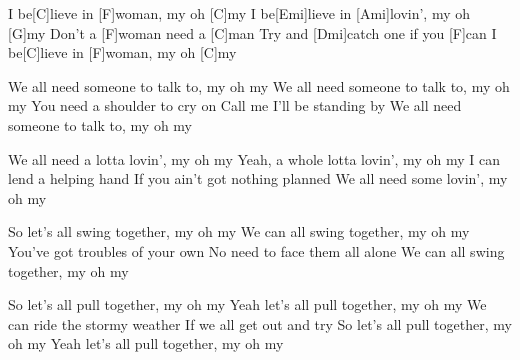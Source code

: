 
\sloka
I be[C]lieve in [F\maj]woman, my oh [C]my
I be[Emi]lieve in [Ami]lovin’, my oh [G]my
Don’t a [F\maj]woman need a [C]man
Try and [Dmi]catch one if you [F]can
I be[C]lieve in [F\maj]woman, my oh [C]my

\sloka
We all need someone to talk to, my oh my
We all need someone to talk to, my oh my
You need a shoulder to cry on
Call me I’ll be standing by
We all need someone to talk to, my oh my

\sloka
We all need a lotta lovin’, my oh my
Yeah, a whole lotta lovin’, my oh my
I can lend a helping hand
If you ain’t got nothing planned
We all need some lovin’, my oh my

\sloka
So let’s all swing together, my oh my
We can all swing together, my oh my
You’ve got troubles of your own
No need to face them all alone
We can all swing together, my oh my

\sloka
So let’s all pull together, my oh my
Yeah let’s all pull together, my oh my
We can ride the stormy weather
If we all get out and try
So let’s all pull together, my oh my
Yeah let’s all pull together, my oh my
